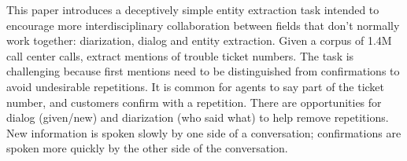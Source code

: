 This paper introduces a deceptively simple entity extraction task intended to encourage more interdisciplinary collaboration between fields that don't normally work together: diarization, dialog and entity extraction.  Given a corpus of 1.4M call center calls, extract mentions of trouble ticket numbers.  The task is challenging because first mentions need to be distinguished from confirmations to avoid undesirable repetitions.  It is common for agents to say part of the ticket number, and customers confirm with a repetition.  There are opportunities for dialog (given/new) and diarization (who said what) to help remove repetitions.  New information is spoken slowly by one side of a conversation; confirmations are spoken more quickly by the other side of the conversation.
